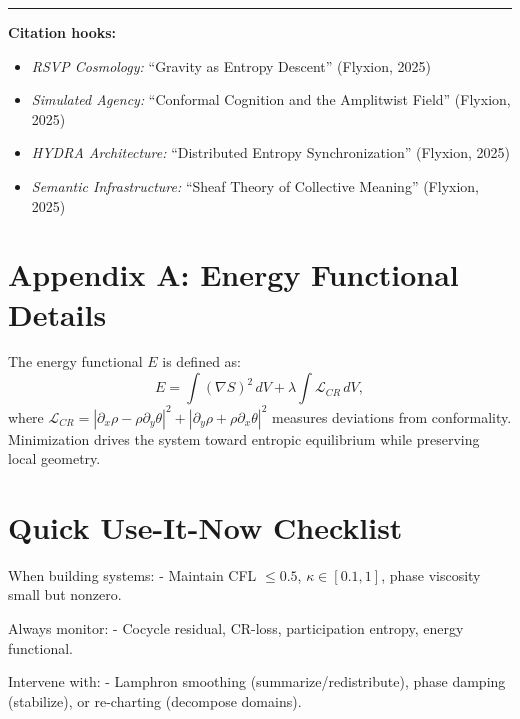 \documentclass[12pt]{article}
\begin{document}
\bigskip
\hrule
\bigskip

\noindent \textbf{Citation hooks:}
\begin{itemize}[leftmargin=1cm]
    \item \emph{RSVP Cosmology:} ``Gravity as Entropy Descent'' (Flyxion, 2025)
    \item \emph{Simulated Agency:} ``Conformal Cognition and the Amplitwist Field'' (Flyxion, 2025)
    \item \emph{HYDRA Architecture:} ``Distributed Entropy Synchronization'' (Flyxion, 2025)
    \item \emph{Semantic Infrastructure:} ``Sheaf Theory of Collective Meaning'' (Flyxion, 2025)
\end{itemize}

\newpage

\appendix

\section{Appendix A: Energy Functional Details}

The energy functional $E$ is defined as:
\[
E = \int (\nabla S)^2 \, dV + \lambda \int \mathcal{L}_{CR} \, dV,
\]
where $\mathcal{L}_{CR} = |\partial_x \rho - \rho \partial_y \theta|^2 + |\partial_y \rho + \rho \partial_x \theta|^2$ measures deviations from conformality. Minimization drives the system toward entropic equilibrium while preserving local geometry.

\section{Quick Use-It-Now Checklist}

When building systems:
- Maintain CFL $\leq 0.5$, $\kappa \in [0.1, 1]$, phase viscosity small but nonzero.

Always monitor:
- Cocycle residual, CR-loss, participation entropy, energy functional.

Intervene with:
- Lamphron smoothing (summarize/redistribute), phase damping (stabilize), or re-charting (decompose domains).
\end{document}
